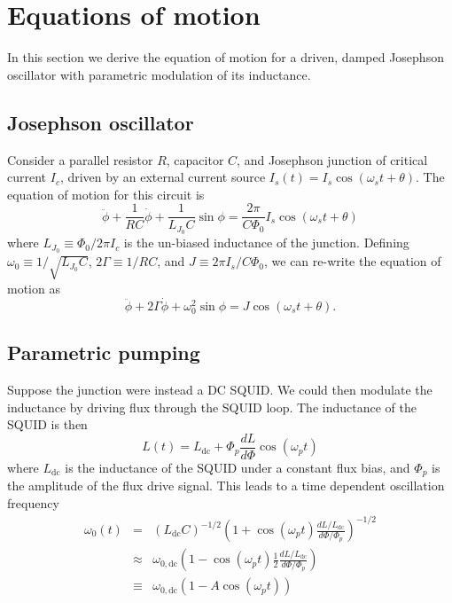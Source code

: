 \section{Equations of motion}

In this section we derive the equation of motion for a driven, damped Josephson oscillator with parametric modulation of its inductance.

\subsection{Josephson oscillator}

Consider a parallel resistor $R$, capacitor $C$, and Josephson junction of critical current $I_c$, driven by an external current source $I_s(t) = I_s \cos(\omega_s t + \theta)$.
The equation of motion for this circuit is
\begin{equation}
\ddot{\phi} + \frac{1}{RC}\dot{\phi} + \frac{1}{L_{J_0}C}\sin \phi = \frac{2\pi}{C \Phi_0} I_s \cos(\omega_s t + \theta)
\end{equation}
where $L_{J_0} \equiv \Phi_0 / 2\pi I_c$ is the un-biased inductance of the junction.
Defining $\omega_0 \equiv 1 / \sqrt{L_{J_0}C}$, $2 \Gamma \equiv 1/RC$, and $J \equiv  2\pi I_s / C \Phi_0$, we can re-write the equation of motion as
\begin{equation}
\ddot{\phi} + 2\Gamma \dot{\phi} + \omega_0^2 \sin \phi = J \cos(\omega_s t + \theta) .
\end{equation}

\subsection{Parametric pumping}

Suppose the junction were instead a DC SQUID. We could then modulate the inductance by driving flux through the SQUID loop. The inductance of the SQUID is then \begin{equation}
L(t) = L_{\textrm{dc}} + \Phi_p \frac{dL}{d\Phi}\cos(\omega_p t) \end{equation}
where $L_{\textrm{dc}}$ is the inductance of the SQUID under a constant flux bias, and $\Phi_p$ is the amplitude of the flux drive signal. This leads to a time dependent oscillation frequency \begin{eqnarray}
\omega_0(t) &=& (L_{\textrm{dc}}C)^{-1/2} \left(1 + \cos(\omega_p t) \frac{dL/L_{\textrm{dc}}} {d\Phi/\Phi_p} \right)^{-1/2} \\
&\approx& \omega_{0,\textrm{dc}} \left( 1 -\cos(\omega_p t) \frac{1}{2}\frac{dL/L_{\textrm{dc}}}{d\Phi/\Phi_p} \right) \\
&\equiv& \omega_{0,\textrm{dc}}\left( 1 - A\cos(\omega_p t) \right) \end{eqnarray}

